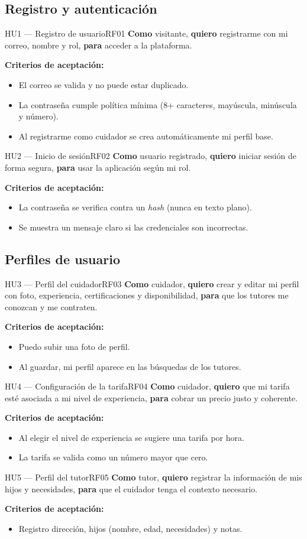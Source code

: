 \documentclass[11pt,a4paper]{article}
\newcommand{\rqp}[3]{%
  \textbf{Como} #1, \textbf{quiero} #2, \textbf{para} #3.\par\vspace{4pt}
  \textbf{\color{guindaDark}Criterios de aceptación:}}
\begin{document}
\subsection{Registro y autenticación}
\begin{hu}{HU1 — Registro de usuario}{RF01}
\rqp{visitante}{registrarme con mi correo, nombre y rol}{acceder a la plataforma}
\begin{itemize}
  \item El correo se valida y no puede estar duplicado.
  \item La contraseña cumple política mínima (8+ caracteres, mayúscula, minúscula y número).
  \item Al registrarme como cuidador se crea automáticamente mi perfil base.
\end{itemize}
\end{hu}
\begin{hu}{HU2 — Inicio de sesión}{RF02}
\rqp{usuario registrado}{iniciar sesión de forma segura}{usar la aplicación según mi rol}
\begin{itemize}
  \item La contraseña se verifica contra un \emph{hash} (nunca en texto plano).
  \item Se muestra un mensaje claro si las credenciales son incorrectas.
\end{itemize}
\end{hu}

\subsection{Perfiles de usuario}
\begin{hu}{HU3 — Perfil del cuidador}{RF03}
\rqp{cuidador}{crear y editar mi perfil con foto, experiencia, certificaciones y disponibilidad}{que los tutores me conozcan y me contraten}
\begin{itemize}
  \item Puedo subir una foto de perfil.
  \item Al guardar, mi perfil aparece en las búsquedas de los tutores.
\end{itemize}
\end{hu}
\begin{hu}{HU4 — Configuración de la tarifa}{RF04}
\rqp{cuidador}{que mi tarifa esté asociada a mi nivel de experiencia}{cobrar un precio justo y coherente}
\begin{itemize}
  \item Al elegir el nivel de experiencia se sugiere una tarifa por hora.
  \item La tarifa se valida como un número mayor que cero.
\end{itemize}
\end{hu}
\begin{hu}{HU5 — Perfil del tutor}{RF05}
\rqp{tutor}{registrar la información de mis hijos y necesidades}{que el cuidador tenga el contexto necesario}
\begin{itemize}
  \item Registro dirección, hijos (nombre, edad, necesidades) y notas.
\end{itemize}
\end{hu}
\end{document}
